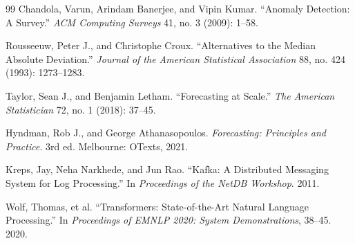 \begin{thebibliography}{99}
Chandola, Varun, Arindam Banerjee, and Vipin Kumar. ``Anomaly Detection: A Survey.'' \textit{ACM Computing Surveys} 41, no. 3 (2009): 1--58.

Rousseeuw, Peter J., and Christophe Croux. ``Alternatives to the Median Absolute Deviation.'' \textit{Journal of the American Statistical Association} 88, no. 424 (1993): 1273--1283.

Taylor, Sean J., and Benjamin Letham. ``Forecasting at Scale.'' \textit{The American Statistician} 72, no. 1 (2018): 37--45.

Hyndman, Rob J., and George Athanasopoulos. \textit{Forecasting: Principles and Practice}. 3rd ed. Melbourne: OTexts, 2021.

Kreps, Jay, Neha Narkhede, and Jun Rao. ``Kafka: A Distributed Messaging System for Log Processing.'' In \textit{Proceedings of the NetDB Workshop}. 2011.

Wolf, Thomas, et al. ``Transformers: State-of-the-Art Natural Language Processing.'' In \textit{Proceedings of EMNLP 2020: System Demonstrations}, 38--45. 2020.

\end{thebibliography}
